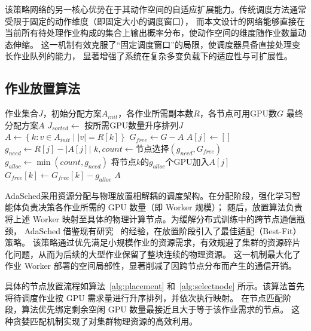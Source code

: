 该策略网络的另一核心优势在于其动作空间的自适应扩展能力。传统调度方法通常受限于固定的动作维度（即固定大小的调度窗口），
而本文设计的网络能够直接在当前所有待处理作业构成的集合上输出概率分布，使动作空间的维度随作业数量动态伸缩。
这一机制有效克服了“固定调度窗口”的局限，使调度器具备直接处理变长作业队列的能力，
显著增强了系统在复杂多变负载下的适应性与可扩展性。

\subsection{作业放置算法}\label{sec:placement}

\begin{algorithm}[htbp]
  \caption{作业放置算法}
  \label{alg:placement}
  \begin{algorithmic}[1]
    \REQUIRE 作业集合$J$，初始分配方案$A_{init}$，各作业所需副本数$R$，各节点可用GPU数$G$
    \ENSURE 最终分配方案$A$
    \STATE $J_{sorted} \leftarrow$ 按所需GPU数量升序排列$J$
    \STATE $A \leftarrow \left\{k : v \in A_{init} \mid \left|v\right| = R[k]\right\}$ 
    \STATE $G_{free} \leftarrow G - A$ 
        \STATE $A[j] \leftarrow []$
          \STATE $g_{need} \leftarrow R[j] - \left|A[j]\right|$
          \STATE $k, count \leftarrow \textbf{节点选择}(g_{need}, G_{free})$ 
          \STATE $g_{alloc} \leftarrow \min\left(count, g_{need}\right)$
          \STATE 将节点$k$的$g_{alloc}$个GPU加入$A[j]$
          \STATE $G_{free}[k] \leftarrow G_{free}[k] - g_{alloc}$
        \ENDWHILE
      \ENDIF
    \ENDFOR
    \RETURN $A$
  \end{algorithmic}
\end{algorithm}

AdaSched采用资源分配与物理放置相解耦的调度架构。在分配阶段，强化学习智能体负责决策各作业所需的 GPU 数量（即 Worker 规模）；
随后，放置算法负责将上述 Worker 映射至具体的物理计算节点。为缓解分布式训练中的跨节点通信瓶颈，
AdaSched 借鉴现有研究~\cite{gu2023elasticflow,chen2023deepboot} 的经验，在放置阶段引入了最佳适配（Best-Fit）策略。
该策略通过优先满足小规模作业的资源需求，有效规避了集群的资源碎片化问题，从而为后续的大型作业保留了整块连续的物理资源。
这一机制最大化了作业 Worker 部署的空间局部性，显著削减了因跨节点分布而产生的通信开销。

具体的节点放置流程如算法~\ref{alg:placement} 和~\ref{alg:selectnode} 所示。该算法首先将待调度作业按 GPU 需求量进行升序排列，并依次执行映射。
在节点匹配阶段，算法优先绑定剩余空闲 GPU 数量最接近且大于等于该作业需求的节点。
这种贪婪匹配机制实现了对集群物理资源的高效利用。

